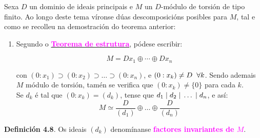 \documentclass[twoside]{report}
\newcommand{\magbf}[1]{\textcolor{magenta}{\textbf{#1}}} %
\theoremstyle{mystyle}
\begin{document}
\vspace{5mm}

\noindent Sexa $D$ un dominio de ideais principais e $M$ un $D$-módulo de torsión de tipo finito. Ao longo deste tema víronse dúas descomposicións posibles para $M$, tal e como se recolleu na demostración do teorema anterior:\\

\renewcommand{\theenumi}{\roman{enumi})}
\renewcommand{\labelenumi}{\theenumi}

\begin{enumerate}

    \item Segundo o \hyperref[th4.2]{\magbf{Teorema de estrutura}}, pódese escribir:
    
    $$M = Dx_{1} \oplus \cdots \oplus Dx_{n}$$
    
    \vspace{2mm}
    
    con $(0 : x_{1}) \supset (0 : x_{2}) \supset \dots \supset (0 : x_{n})$, e $(0 : x_{k}) \neq D \hspace{2mm} \forall k$. Sendo ademais $M$ módulo de torsión, tamén se verifica que $(0 : x_{k}) \neq \{0\}$ para cada $k$.\\
    
    Se $d_{k}$ é tal que $(0 : x_{k}) = (d_{k})$, tense que $d_{1} \hspace{1mm} | \hspace{1mm} d_{2} \hspace{1mm} | \hspace{1mm} \dots \hspace{1mm} | \hspace{1mm} d_{n}$, e así:
    $$M \simeq \displaystyle \frac{D}{(d_{1})} \oplus \dots \oplus \frac{D}{(d_{n})}$$
\end{enumerate}

\noindent \textbf{Definición 4.8}. Os ideais $(d_{k})$ denomínanse \magbf{factores invariantes de $M$}.\\
\end{document}
